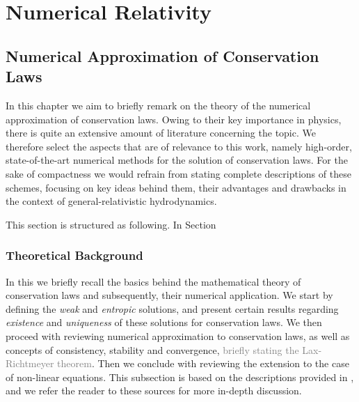 
\chapter{Numerical Relativity}


\section{Numerical Approximation of Conservation Laws}



In this chapter we aim to briefly remark on the theory of the numerical approximation of conservation laws. 
Owing to their key importance in physics, there is quite an extensive amount of literature concerning the topic. 
We therefore select the aspects that are of relevance to this work, namely high-order, state-of-the-art numerical methods for the solution of conservation laws. 
For the sake of compactness we would refrain from stating complete descriptions of these schemes, focusing on key ideas behind them, their advantages and drawbacks in the context of general-relativistic hydrodynamics.

This section is structured as following. 
In Section 


\subsection{Theoretical Background}


In this  we briefly recall the basics behind the mathematical theory of conservation laws and subsequently, their numerical application. 
We start by defining the \textit{weak} and \textit{entropic} solutions, and present certain results regarding \textit{existence} and \textit{uniqueness} of these solutions for conservation laws. 
We then proceed with reviewing numerical approximation to conservation laws, as well as concepts of consistency, stability and convergence, \textcolor{gray}{briefly stating the Lax-Richtmeyer theorem}. 
Then we conclude with reviewing the extension to the case of non-linear equations. 
This subsection is based on the descriptions provided in \cite{LeVeque:1992,Tadmor1998}, and we refer the reader to these sources for more in-depth discussion.

